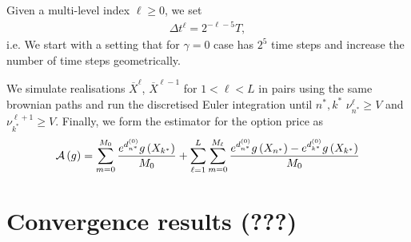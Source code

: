 \documentclass[11pt]{amsart}
\begin{document}
Given a multi-level index $\ell \geq 0$, we set
\begin{align*}
\Delta t^{\ell} = 2^{-\ell-5} T,
\end{align*}
i.e. We start with a setting that for $\gamma=0$ case
has $2^5$ time steps and increase the number of time steps geometrically.

We simulate realisations $\overline X^\ell$, $\overline X^{\ell-1}$ for
$1<\ell<L$ in pairs using the same brownian paths and run the discretised Euler integration until $n^*,k^*$ $\nu_{n^*}^\ell \geq V$ and $\nu_{k^*}^{\ell+1} \geq V$. Finally, we form the estimator for the option price as
\begin{align}
\mathcal A \left( {g} \right) = \displaystyle\sum\limits_{m=0}^{M_0} \frac{e^{d_{n^*}^{\left( {0} \right)}} g \left( {X_{k^*}} \right) }{M_0}
+
\displaystyle\sum\limits_{\ell=1}^{L} \displaystyle\sum\limits_{m=0}^{M_\ell}
\frac{e^{d_{n^*}^{\left( {0} \right)}} g \left( {X_{n^*}} \right) - e^{d_{k^*}^{\left( {0} \right)}} g \left( {X_{k^*}} \right) }{M_0}
\end{align}

\section{Convergence results (???)}




\appendix
\end{document}
